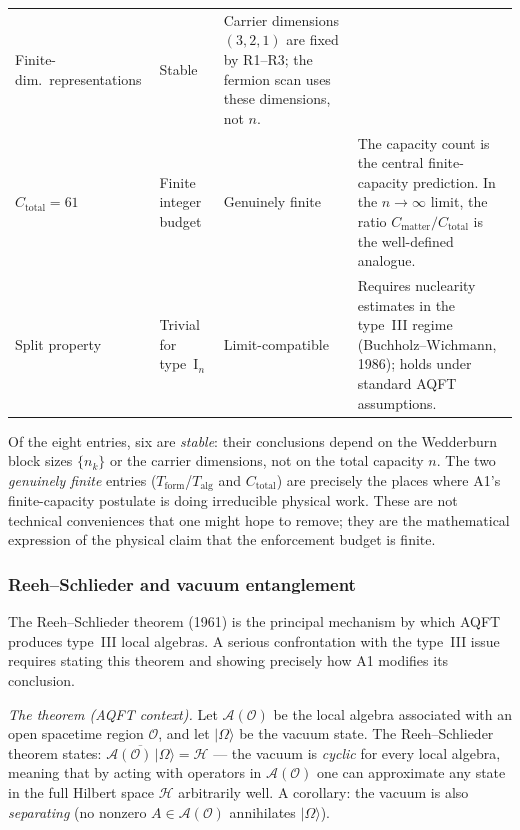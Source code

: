 \documentclass[11pt,a4paper]{article}
\theoremstyle{definition}
\begin{document}
\begin{center}
\begin{tabular}{@{}p{2.6cm}p{4.5cm}p{2.0cm}p{3.8cm}@{}}
  Finite-dim.\ representations &
  Stable &
  Carrier dimensions $(3, 2, 1)$ are fixed by R1--R3; the fermion scan uses these dimensions, not $n$. \\[2pt]
$C_{\mathrm{total}} = 61$ &
  Finite integer budget &
  Genuinely finite &
  The capacity count is the central finite-capacity prediction.  In the $n \to \infty$ limit, the ratio $C_{\mathrm{matter}} / C_{\mathrm{total}}$ is the well-defined analogue. \\[2pt]
Split property &
  Trivial for type~I$_n$ &
  Limit-compatible &
  Requires nuclearity estimates in the type~III regime (Buchholz--Wichmann, 1986); holds under standard AQFT assumptions. \\
\bottomrule
\end{tabular}
\end{center}

\smallskip\noindent Of the eight entries, six are \textit{stable}: their
conclusions depend on the Wedderburn block sizes $\{n_k\}$ or the
carrier dimensions, not on the total capacity $n$.  The two
\textit{genuinely finite} entries ($T_{\mathrm{form}}$/$T_{\mathrm{alg}}$
and $C_{\mathrm{total}}$) are precisely the places where A1's
finite-capacity postulate is doing irreducible physical work.  These are
not technical conveniences that one might hope to remove; they are the
mathematical expression of the physical claim that the enforcement
budget is finite.


\subsubsection{Reeh--Schlieder and vacuum entanglement}
\label{sec:reeh_schlieder}

The Reeh--Schlieder theorem (1961) is the principal mechanism by which
AQFT produces type~III local algebras.  A serious confrontation with
the type~III issue requires stating this theorem and showing precisely
how A1 modifies its conclusion.

\smallskip\noindent\textit{The theorem (AQFT context).}\quad
Let $\mathcal{A}(\mathcal{O})$ be the local algebra associated with an
open spacetime region $\mathcal{O}$, and let $|\Omega\rangle$ be the
vacuum state.  The Reeh--Schlieder theorem states:
$\overline{\mathcal{A}(\mathcal{O})\,|\Omega\rangle} = \mathcal{H}$
--- the vacuum is \emph{cyclic} for every local algebra, meaning that
by acting with operators in $\mathcal{A}(\mathcal{O})$ one can
approximate any state in the full Hilbert space $\mathcal{H}$
arbitrarily well.  A corollary: the vacuum is also \emph{separating}
(no nonzero $A \in \mathcal{A}(\mathcal{O})$ annihilates
$|\Omega\rangle$).
\end{document}
